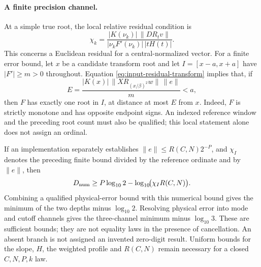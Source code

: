 \paragraph{A finite precision channel.}
At a simple true root, the local relative residual condition is
\begin{equation}\label{eq:indexed-residual-condition}
 \chi_k=\frac{|K(\nu_k)|\,\|DR_tv\|}
 {|\nu_kF'(\nu_k)|\,|tH(t)|}.
\end{equation}
This concerns a Euclidean residual for a central-normalized vector.
For a finite error bound, let $x$ be a candidate transform root and let
$I=[x-a,x+a]$ have $|F'|\ge m>0$ throughout. Equation
\eqref{eq:input-residual-transform} implies that, if
\[
 E=\frac{|K(x)|\,\|XR_{(x/\beta)^2}w\|\,\|e\|}{m}<a,
\]
then $F$ has exactly one root in $I$, at distance at most $E$ from $x$.
Indeed, $F$ is strictly monotone and has opposite endpoint signs. An
indexed reference window and the preceding root count must also be
qualified; this local statement alone does not assign an ordinal.

If an implementation separately establishes
$\|e\|\le R(C,N)2^{-P}$, and $\chi_I$ denotes the preceding finite
bound divided by the reference ordinate and by $\|e\|$, then
\begin{equation}\label{eq:indexed-precision-budget}
 D_{\rm num}\ge P\log_{10}2-\log_{10}\!\bigl(\chi_I R(C,N)\bigr).
\end{equation}
Combining a qualified physical-error bound with this numerical bound
gives the minimum of the two depths minus $\log_{10}2$. Resolving physical
error into mode and cutoff channels gives the three-channel minimum
minus $\log_{10}3$. These are sufficient bounds; they are not equality
laws in the presence of cancellation. An absent branch is not assigned
an invented zero-digit result. Uniform bounds for the slope, $H$, the
weighted profile and $R(C,N)$ remain necessary for a closed $C,N,P,k$ law.

